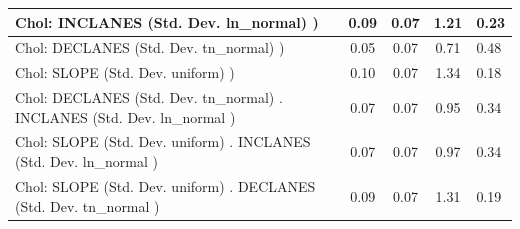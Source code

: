 \begin{table}
\begin{center}
\begin{tabular}{|l|l|c|c|c|l|}
			\hline
			 Chol: INCLANES (Std. Dev. ln_normal) ) &  & 0.09 & 0.07 & 1.21 & 0.23 \\
			\hline
			 Chol: DECLANES (Std. Dev. tn_normal) ) &  & 0.05 & 0.07 & 0.71 & 0.48 \\
			\hline
			 Chol: SLOPE (Std. Dev. uniform) ) &  & 0.10 & 0.07 & 1.34 & 0.18 \\
			\hline
			 Chol: DECLANES (Std. Dev. tn_normal) . INCLANES (Std. Dev.   ln_normal ) &  & 0.07 & 0.07 & 0.95 & 0.34 \\
			\hline
			 Chol: SLOPE (Std. Dev. uniform) . INCLANES (Std. Dev.   ln_normal ) &  & 0.07 & 0.07 & 0.97 & 0.34 \\
			\hline
			 Chol: SLOPE (Std. Dev. uniform) . DECLANES (Std. Dev.   tn_normal ) &  & 0.09 & 0.07 & 1.31 & 0.19 \\
			\hline
		\end{tabular}
	\end{center}
\end{table}